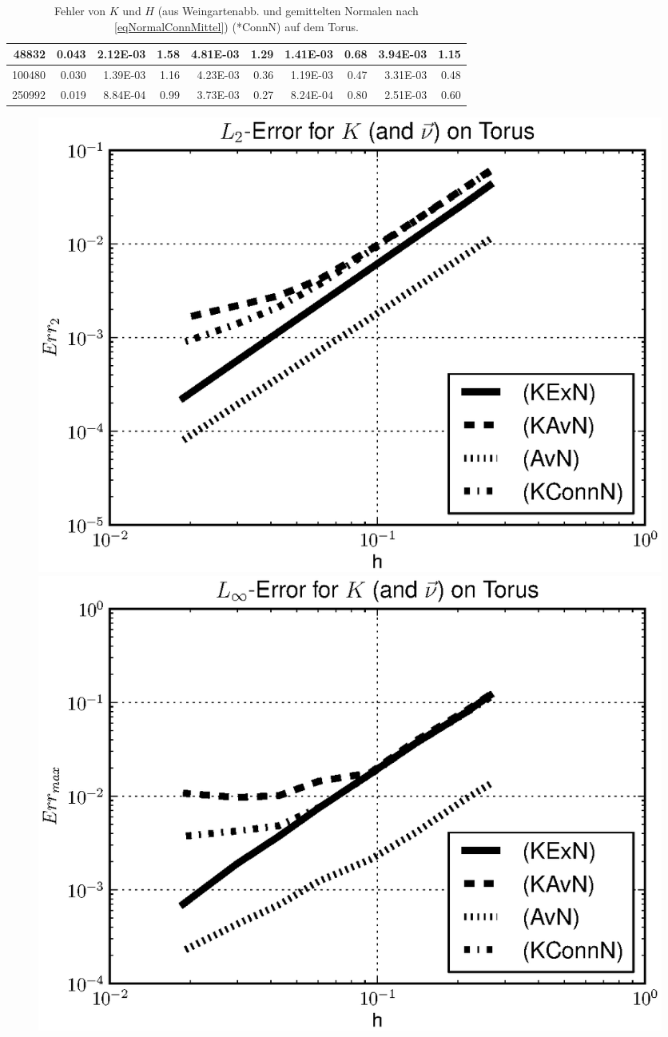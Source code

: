 \begin{beispiel}[Torus]
\begin{table}[htbp]
\begin{tabular}{|r|r|r|r|r|r|r|r|r|r|}
48832 & 0.043 & 2.12E-03 & 1.58 & 4.81E-03 & 1.29 & 1.41E-03 & 0.68 & 3.94E-03 & 1.15 \\ \hline
100480 & 0.030 & 1.39E-03 & 1.16 & 4.23E-03 & 0.36 & 1.19E-03 & 0.47 & 3.31E-03 & 0.48 \\ \hline
250992 & 0.019 & 8.84E-04 & 0.99 & 3.73E-03 & 0.27 & 8.24E-04 & 0.80 & 2.51E-03 & 0.60 \\ \hline
      \end{tabular}
      \caption[Gauß-/mittlere Krümmung aus Weingartenabb. auf Torus (ConnN)]{Fehler von \( K \) und \( H \) (aus Weingartenabb. und
      gemittelten Normalen nach \eqref{eqNormalConnMittel}) (*ConnN) auf dem Torus.}
      \label{tabWeingartenFehlerTorusConnN}
      \end{table}
       
      \begin{figure}
        \begin{minipage}[t]{0.49\textwidth}
          \centering\includegraphics[width=\textwidth]{bilder/Curvature/TorusKWein2Plot.eps}
        \end{minipage} \hfill
        \begin{minipage}[t]{0.49\textwidth}
          \centering\includegraphics[width=\textwidth]{bilder/Curvature/TorusKWeinMaxPlot.eps}

\end{minipage}
\end{figure}
\end{beispiel}
